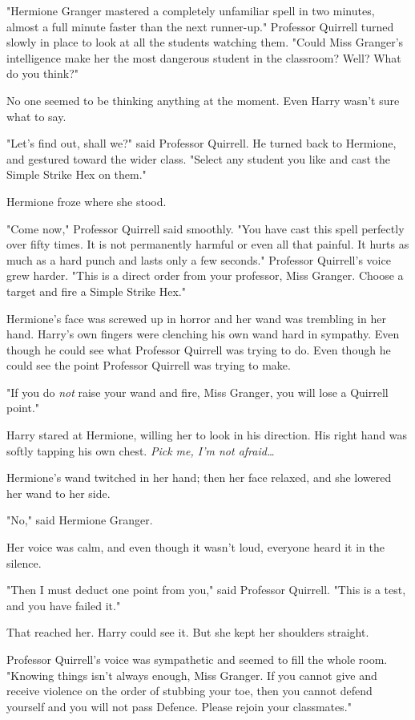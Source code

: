 "Hermione Granger mastered a completely unfamiliar spell in two minutes, almost 
a full minute faster than the next runner-up." Professor Quirrell turned slowly 
in place to look at all the students watching them. "Could Miss Granger's 
intelligence make her the most dangerous student in the classroom? Well? What 
do you think?"

No one seemed to be thinking anything at the moment. Even Harry wasn't sure 
what to say.

"Let's find out, shall we?" said Professor Quirrell. He turned back to 
Hermione, and gestured toward the wider class. "Select any student you like and 
cast the Simple Strike Hex on them."

Hermione froze where she stood.

"Come now," Professor Quirrell said smoothly. "You have cast this spell 
perfectly over fifty times. It is not permanently harmful or even all that 
painful. It hurts as much as a hard punch and lasts only a few seconds." 
Professor Quirrell's voice grew harder. "This is a direct order from your 
professor, Miss Granger. Choose a target and fire a Simple Strike Hex."

Hermione's face was screwed up in horror and her wand was trembling in her 
hand. Harry's own fingers were clenching his own wand hard in sympathy. Even 
though he could see what Professor Quirrell was trying to do. Even though he 
could see the point Professor Quirrell was trying to make.

"If you do \emph{not} raise your wand and fire, Miss Granger, you will lose a 
Quirrell point."

Harry stared at Hermione, willing her to look in his direction. His right hand 
was softly tapping his own chest. \emph{Pick me, I'm not afraid{\ldots}}

Hermione's wand twitched in her hand; then her face relaxed, and she lowered 
her wand to her side.

"No," said Hermione Granger.

Her voice was calm, and even though it wasn't loud, everyone heard it in the 
silence.

"Then I must deduct one point from you," said Professor Quirrell. "This is a 
test, and you have failed it."

That reached her. Harry could see it. But she kept her shoulders straight.

Professor Quirrell's voice was sympathetic and seemed to fill the whole room. 
"Knowing things isn't always enough, Miss Granger. If you cannot give and 
receive violence on the order of stubbing your toe, then you cannot defend 
yourself and you will not pass Defence. Please rejoin your classmates."

